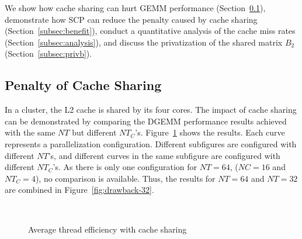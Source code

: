 We show how cache sharing can hurt GEMM performance
(Section~\ref{subsec:drawback}),
demonstrate how SCP can reduce
the penalty caused by cache sharing 
(Section~\ref{subsec:benefit}), conduct a 
quantitative analysis of the cache miss rates
(Section~\ref{subsec:analysis}), and
discuss the privatization of the shared matrix $B_2$
(Section~\ref{subsec:privb}).

\subsection{Penalty of Cache Sharing}\label{subsec:drawback}

In a cluster, the L2 cache is shared by its four cores.
The impact of cache sharing can be demonstrated
by comparing the DGEMM performance results achieved
with the same $NT$
but different $NT_C$'s.
Figure~\ref{fig:drawback} shows the results.
Each curve represents a parallelization configuration.
Different subfigures are configured with different $NT$'s,
and different curves in the same subfigure are
configured with different $NT_C$'s.
As there is only one configuration for $NT=64$,
($NC=16$ and $NT_C=4$),
no comparison is available. Thus,
the results for $NT=64$ and $NT=32$ are combined in Figure~\ref{fig:drawback-32}.

\begin{figure}
  \centering
  \\
  \caption{Average thread efficiency with cache sharing}
  \label{fig:drawback}
\end{figure}

